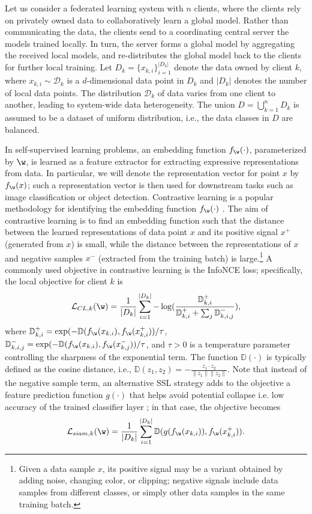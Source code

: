 Let us consider a federated learning system with $n$ clients, where the clients rely on privately owned data to collaboratively learn a global model. Rather than communicating the data, the clients send to a coordinating central server the models trained locally. In turn, the server forms a global model by aggregating the received local models, and re-distributes the global model back to the clients for further local training. Let $D_k = \{x_{k, i} \}_{i=1}^{|D_k|}$ denote the data owned by client $k$, where $x_{k, i} \sim \mathcal{D}_k$ is a $d$-dimensional data point in $D_k$ and $|D_k|$ denotes the number of local data points. The distribution $\mathcal{D}_k$ of data varies from one client to another, leading to system-wide data heterogeneity. The union $D = \bigcup_{k=1}^n D_k$ is assumed to be a dataset of uniform distribution, i.e., the data classes in $D$ are balanced. 

In self-supervised learning problems, an embedding function $f_{\w}(\cdot)$, parameterized by $\w$, is learned as a feature extractor for extracting expressive representations from data. In particular, we will denote the representation vector for point $x$ by $f_{\w}(x)$; such a representation vector is then used for downstream tasks such as image classification or object detection. Contrastive learning is a popular methodology for identifying the embedding function $f_{\w}(\cdot)$ \cite{chen2020simple}. The aim of contrastive learning is to find an embedding function such that the distance between the learned representations of data point $x$ and its positive signal $x^+$ (generated from $x$) is small, while the distance between the representations of $x$ and negative samples $x^{-}$ (extracted from the training batch) is large.\footnote{Given a data sample $x$, its positive signal may be a variant obtained by adding noise, changing color, or clipping; negative signals include data samples from different classes, or simply other data samples in the same training batch.}
A commonly used objective in contrastive learning is the InfoNCE loss; specifically, the local objective for client $k$ is
\[
\mathcal{L}_{CL, k}(\w) = \frac{1}{|D_k|}\sum_{i=1}^{|D_k|} -\log ( \frac{\mathbb{D}_{k, i}^+}{ \mathbb{D}_{k, i}^+ + \sum_j \mathbb{D}_{k, i, j}^-}), 
\]
where
$\mathbb{D}_{k, i}^+ = \exp(-\mathbb{D}(f_{\w}(x_{k, i}), f_{\w}(x_{k, i}^+))/\tau$, $\mathbb{D}_{k, i, j}^- = \exp(-\mathbb{D}(f_{\w}(x_{k, i}), f_{\w}(x_{k, j}^-))/\tau$, and
$\tau >0$ is a temperature parameter controlling the sharpness of the exponential term. The function $\mathbb{D}(\cdot)$ is typically defined as the cosine distance, i.e., $\mathbb{D}(z_1, z_2) = -\frac{z_1 \cdot z_2}{\|z_1 \| \|z_2 \|}$. Note that instead of the negative sample term, an alternative SSL strategy adds to the objective a feature prediction function $g(\cdot)$ that helps avoid potential collapse i.e. low accuracy of the trained classifier layer \cite{chen2021exploring}; in that case, the objective becomes 
\[
\mathcal{L}_{siam, k}(\w) =  \frac{1}{|D_k|}\sum_{i=1}^{|D_k|} \mathbb{D}(g(f_{\w}(x_{k, i})), f_{\w}(x_{k, i}^+)).
\]

